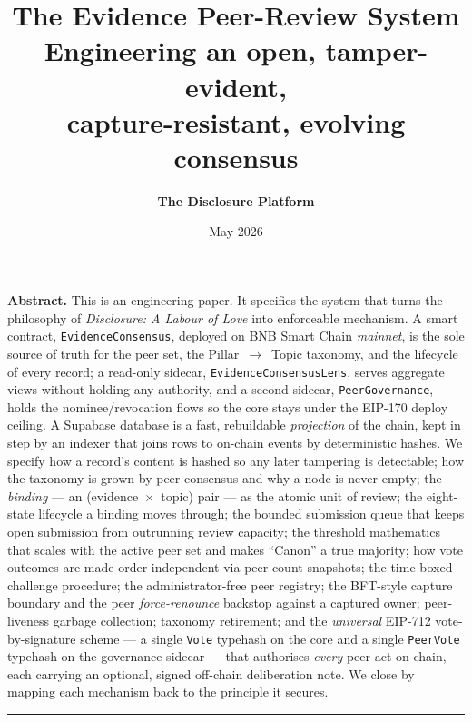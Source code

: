 \documentclass[11pt,a4paper]{article}
\title{
  \vspace{-2em}
  {\Huge\bfseries The Evidence Peer-Review System}\\[0.6em]
  {\Large Engineering an open, tamper-evident,\\
   capture-resistant, evolving consensus}
}
\author{\textbf{The Disclosure Platform}}
\date{May 2026}
\newcommand{\arr}{\ensuremath{\rightarrow}}
\begin{document}
\maketitle
\thispagestyle{empty}

\vspace{-1em}
\begin{plainbox}
\textbf{Abstract.}
This is an engineering paper. It specifies the system that turns the
philosophy of \emph{Disclosure: A Labour of Love} into enforceable
mechanism. A smart contract, \texttt{EvidenceConsensus}, deployed on
BNB Smart Chain \emph{mainnet}, is the sole source of truth for the peer
set, the Pillar~\arr~Topic taxonomy, and the lifecycle of every record;
a read-only sidecar, \texttt{EvidenceConsensusLens}, serves aggregate
views without holding any authority, and a second sidecar,
\texttt{PeerGovernance}, holds the nominee/revocation flows so the core
stays under the EIP-170 deploy ceiling. A Supabase database is a fast,
rebuildable \emph{projection} of the chain, kept in step by an indexer
that joins rows to on-chain events by deterministic hashes. We specify
how a record's content is hashed so any later tampering is detectable;
how the taxonomy is grown by peer consensus and why a node is never
empty; the \emph{binding} --- an (evidence~$\times$~topic) pair --- as
the atomic unit of review; the eight-state lifecycle a binding moves
through; the bounded submission queue that keeps open submission from
outrunning review capacity; the threshold mathematics that scales with
the active peer set and makes ``Canon'' a true majority; how vote
outcomes are made order-independent via peer-count snapshots; the
time-boxed challenge procedure; the administrator-free peer registry;
the BFT-style capture boundary and the peer \emph{force-renounce}
backstop against a captured owner; peer-liveness garbage collection;
taxonomy retirement; and the \emph{universal} EIP-712
vote-by-signature scheme --- a single \texttt{Vote} typehash on the core
and a single \texttt{PeerVote} typehash on the governance sidecar ---
that authorises \emph{every} peer act on-chain, each carrying an
optional, signed off-chain deliberation note. We close by mapping each
mechanism back to the principle it secures.
\end{plainbox}

\tableofcontents
\vspace{1em}
\hrule
\vspace{1em}
\end{document}
